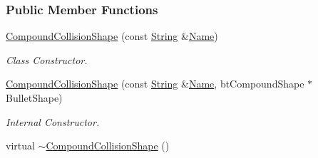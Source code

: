 \subsubsection*{Public Member Functions}
\begin{DoxyCompactItemize}
\item 
\hyperlink{classMezzanine_1_1CompoundCollisionShape_ad8cdd209d948e98b629378db81a77181}{CompoundCollisionShape} (const \hyperlink{namespaceMezzanine_acf9fcc130e6ebf08e3d8491aebcf1c86}{String} \&\hyperlink{classMezzanine_1_1CollisionShape_aac524c5c56fa4d158bc071f8aecfbe79}{Name})
\begin{DoxyCompactList}\small\item\em Class Constructor. \item\end{DoxyCompactList}\item 
\hyperlink{classMezzanine_1_1CompoundCollisionShape_a3d31ddbff556b73429acc44ae6aeeef3}{CompoundCollisionShape} (const \hyperlink{namespaceMezzanine_acf9fcc130e6ebf08e3d8491aebcf1c86}{String} \&\hyperlink{classMezzanine_1_1CollisionShape_aac524c5c56fa4d158bc071f8aecfbe79}{Name}, btCompoundShape $\ast$BulletShape)
\begin{DoxyCompactList}\small\item\em Internal Constructor. \item\end{DoxyCompactList}\item 
\hypertarget{classMezzanine_1_1CompoundCollisionShape_a8dae4d989a8c3ffd4bb7f75fbaeb9c29}{
virtual \hyperlink{classMezzanine_1_1CompoundCollisionShape_a8dae4d989a8c3ffd4bb7f75fbaeb9c29}{$\sim$CompoundCollisionShape} ()}
\label{classMezzanine_1_1CompoundCollisionShape_a8dae4d989a8c3ffd4bb7f75fbaeb9c29}


\end{DoxyCompactItemize}
